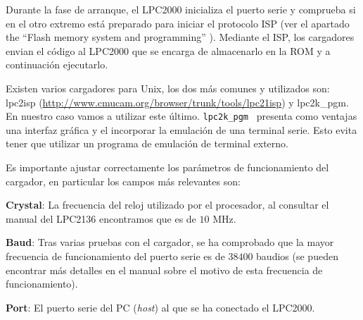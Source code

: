 \documentclass[10pt,a4paper]{article}
\newcommand{\hrefx}[1]{\href{#1}{#1}} %
\newenvironment{itemize*}
        {\begin{itemize}%
                \setlength{\parskip}{2pt}%
                \setlength{\itemsep}{0pt}}
        {\end{itemize}}
\begin{document}
	Durante la fase de arranque, el LPC2000 inicializa el puerto serie y comprueba si en el otro extremo está preparado para iniciar el protocolo ISP (ver el apartado the ``Flash memory system and programming'' \cite{lpc213x-um}). Mediante el ISP, los cargadores envian el código al LPC2000 que se encarga de almacenarlo en la ROM y a continuación ejecutarlo.
	
	Existen varios cargadores para Unix, los dos más comunes y utilizados son: lpc2isp (\hrefx{http://www.cmucam.org/\-browser/\-trunk/\-tools/\-lpc21isp}) y lpc2k\_pgm.  En nuestro caso vamos a utilizar este último. \texttt{lpc2k\_pgm}~\cite{lpc2k_pgm} presenta como ventajas una interfaz gráfica y el incorporar la emulación de una terminal serie. Esto evita tener que utilizar un programa de emulación de terminal externo.
	
	Es importante ajustar correctamente los parámetros de funcionamiento del cargador, en particular los campos más relevantes son:

	\begin{itemize*}
	\item \textbf{Crystal}: La frecuencia del reloj utilizado por el procesador, al consultar el manual del LPC2136 encontramos que es de $10$ MHz.

	\item \textbf{Baud}: Tras varias pruebas con el cargador, se ha comprobado que la mayor frecuencia de funcionamiento del puerto 	serie es de $38400$ baudios (se pueden encontrar más detalles en el manual sobre el motivo de esta frecuencia de funcionamiento).
	  
	\item \textbf{Port}: El puerto serie del PC (\emph{host}) al que se ha conectado el LPC2000.
	\end{itemize*}
	
\end{document}
